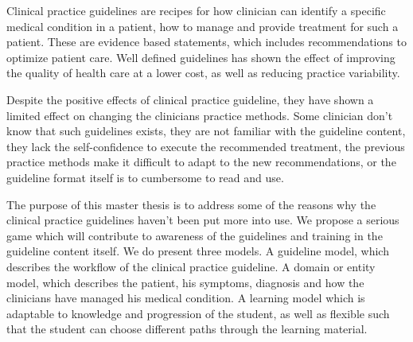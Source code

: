  Clinical practice guidelines are recipes for how clinician can identify a specific medical condition in a patient, how to manage and provide treatment for such a patient. These are evidence based statements, which includes recommendations to optimize patient care. Well defined guidelines has shown the effect of improving the quality of health care at a lower cost, as well as reducing practice variability.
 
 Despite the positive effects of clinical practice guideline, they have shown a limited effect on changing the clinicians practice methods. Some clinician don't know that such guidelines exists, they are not familiar with the guideline content, they lack the self-confidence to execute the recommended treatment, the previous practice methods make it difficult to adapt to the new recommendations, or the guideline format itself is to cumbersome to read and use.
 
 The purpose of this master thesis is to address some of the reasons why the clinical practice guidelines haven't been put more into use. We propose a serious game which will contribute to awareness of the guidelines and training in the guideline content itself. We do present three models. A guideline model, which describes the workflow of the clinical practice guideline. A domain or entity model, which describes the patient, his symptoms, diagnosis and how the clinicians have managed his medical condition. A learning model which is adaptable to knowledge and progression of the student, as well as flexible such that the student can choose different paths through the learning material.